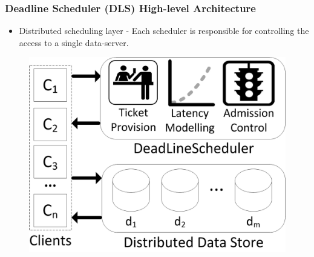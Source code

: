\documentclass{beamer}
\begin{document}
\begin{frame}
  \frametitle{Deadline Scheduler (DLS) High-level Architecture}
  \begin{itemize}
  \item Distributed scheduling layer - Each scheduler is responsible for
    controlling the access to a single data-server.
  \end{itemize}
  \begin{figure}
    \begin{center}
      \centerline{\includegraphics[scale=0.90]{img/DLS.png}}
    \end{center}
  \end{figure}
\end{frame}
\end{document}
